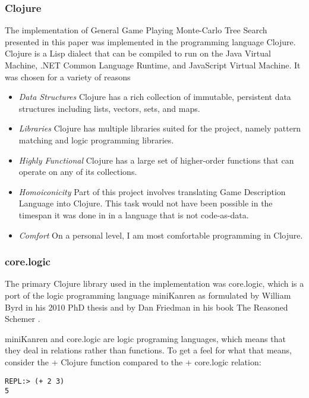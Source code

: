 \documentclass[letterpaper]{article}
\begin{document}
\subsubsection{Clojure}
The implementation of General Game Playing Monte-Carlo Tree Search presented in this paper was implemented in the programming language Clojure. Clojure is a Lisp dialect that can be compiled to run on the Java Virtual Machine, .NET Common Language Runtime, and JavaScript Virtual Machine. It was chosen for a variety of reasons
\begin{itemize}

\item \emph{Data Structures} Clojure has a rich collection of immutable, persistent data structures including lists, vectors, sets, and maps.
\item \emph{Libraries} Clojure has multiple libraries suited for the project, namely pattern matching and logic programming libraries.
\item \emph{Highly Functional} Clojure has a large set of higher-order functions that can operate on any of its collections.
\item \emph{Homoiconicity} Part of this project involves translating Game Description Language into Clojure. This task would not have been possible in the timespan it was done in in a language that is not code-as-data.
\item \emph{Comfort} On a personal level, I am most comfortable programming in Clojure.
\end{itemize}
\subsubsection{core.logic}

The primary Clojure library used in the implementation was core.logic, which is a port of the logic programming language miniKanren as formulated by William Byrd in his 2010 PhD thesis \cite{byrd2010relational} and by Dan Friedman in his book The Reasoned Schemer \cite{reasonedschemer}.

miniKanren and core.logic are logic programing languages, which means that they deal in relations rather than functions. To get a feel for what that means, consider the + Clojure function compared to the + core.logic relation:

\begin{lstlisting}[frame=single, caption=The + function]
REPL:> (+ 2 3)
5
\end{lstlisting}
\end{document}
